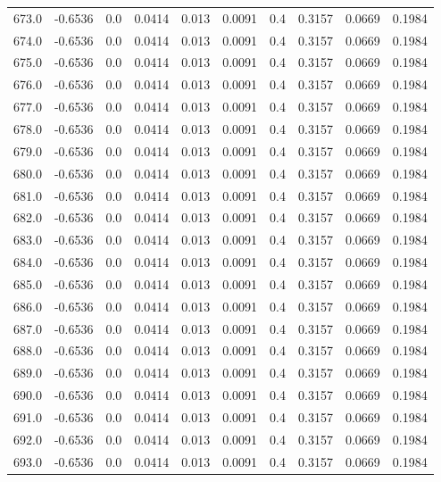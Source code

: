 \begin{longtable}{lrrrrrrrrr}
673.0 & -0.6536 & 0.0 & 0.0414 & 0.013 & 0.0091 & 0.4 & 0.3157 & 0.0669 & 0.1984 \\
674.0 & -0.6536 & 0.0 & 0.0414 & 0.013 & 0.0091 & 0.4 & 0.3157 & 0.0669 & 0.1984 \\
675.0 & -0.6536 & 0.0 & 0.0414 & 0.013 & 0.0091 & 0.4 & 0.3157 & 0.0669 & 0.1984 \\
676.0 & -0.6536 & 0.0 & 0.0414 & 0.013 & 0.0091 & 0.4 & 0.3157 & 0.0669 & 0.1984 \\
677.0 & -0.6536 & 0.0 & 0.0414 & 0.013 & 0.0091 & 0.4 & 0.3157 & 0.0669 & 0.1984 \\
678.0 & -0.6536 & 0.0 & 0.0414 & 0.013 & 0.0091 & 0.4 & 0.3157 & 0.0669 & 0.1984 \\
679.0 & -0.6536 & 0.0 & 0.0414 & 0.013 & 0.0091 & 0.4 & 0.3157 & 0.0669 & 0.1984 \\
680.0 & -0.6536 & 0.0 & 0.0414 & 0.013 & 0.0091 & 0.4 & 0.3157 & 0.0669 & 0.1984 \\
681.0 & -0.6536 & 0.0 & 0.0414 & 0.013 & 0.0091 & 0.4 & 0.3157 & 0.0669 & 0.1984 \\
682.0 & -0.6536 & 0.0 & 0.0414 & 0.013 & 0.0091 & 0.4 & 0.3157 & 0.0669 & 0.1984 \\
683.0 & -0.6536 & 0.0 & 0.0414 & 0.013 & 0.0091 & 0.4 & 0.3157 & 0.0669 & 0.1984 \\
684.0 & -0.6536 & 0.0 & 0.0414 & 0.013 & 0.0091 & 0.4 & 0.3157 & 0.0669 & 0.1984 \\
685.0 & -0.6536 & 0.0 & 0.0414 & 0.013 & 0.0091 & 0.4 & 0.3157 & 0.0669 & 0.1984 \\
686.0 & -0.6536 & 0.0 & 0.0414 & 0.013 & 0.0091 & 0.4 & 0.3157 & 0.0669 & 0.1984 \\
687.0 & -0.6536 & 0.0 & 0.0414 & 0.013 & 0.0091 & 0.4 & 0.3157 & 0.0669 & 0.1984 \\
688.0 & -0.6536 & 0.0 & 0.0414 & 0.013 & 0.0091 & 0.4 & 0.3157 & 0.0669 & 0.1984 \\
689.0 & -0.6536 & 0.0 & 0.0414 & 0.013 & 0.0091 & 0.4 & 0.3157 & 0.0669 & 0.1984 \\
690.0 & -0.6536 & 0.0 & 0.0414 & 0.013 & 0.0091 & 0.4 & 0.3157 & 0.0669 & 0.1984 \\
691.0 & -0.6536 & 0.0 & 0.0414 & 0.013 & 0.0091 & 0.4 & 0.3157 & 0.0669 & 0.1984 \\
692.0 & -0.6536 & 0.0 & 0.0414 & 0.013 & 0.0091 & 0.4 & 0.3157 & 0.0669 & 0.1984 \\
693.0 & -0.6536 & 0.0 & 0.0414 & 0.013 & 0.0091 & 0.4 & 0.3157 & 0.0669 & 0.1984 \\

\end{longtable}
